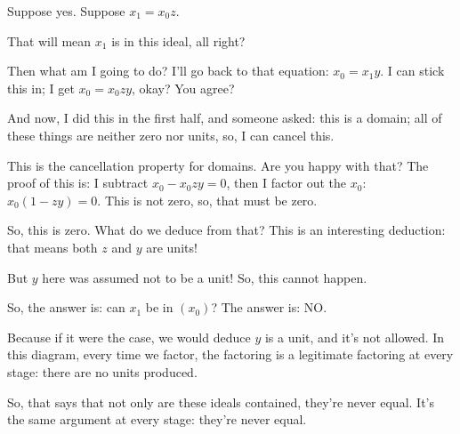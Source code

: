 \begin{proofWrapper}
\begin{content}
\end{content}

\begin{speech}[01:07:11 - 01:09:39]
Suppose yes. Suppose $x_1 = x_0 z$. 

That will mean $x_1$ is in this ideal, all right?

Then what am I going to do? I'll go back to that equation: $x_0 = x_1 y$.  I can stick this in; I get $x_0 = x_0 z y$,  okay? You agree?

And now, I did this in the first half, and someone asked: this is a domain; all of these things are neither zero nor units, so, I can cancel this. 

This is the cancellation property for domains. Are you happy with that? The proof of this is: I subtract $x_0 - x_0 z y = 0$, then I factor out the $x_0$: $x_0(1 - z y) = 0$. This is not zero, so, that must be zero. 

So, this is zero. What do we deduce from that? This is an interesting deduction: that means both $z$ and $y$ are units! 

But $y$ here was assumed not to be a unit! So, this cannot happen.

So, the answer is: can $x_1$ be in $(x_0)$? The answer is: NO. 

Because if it were the case, we would deduce $y$ is a unit, and it's not allowed. In this diagram, every time we factor, the factoring is a legitimate factoring at every stage: there are no units produced.

So, that says that not only are these ideals contained, they're never equal. It's the same argument at every stage: they're never equal. 


\end{speech}
\end{proofWrapper}
